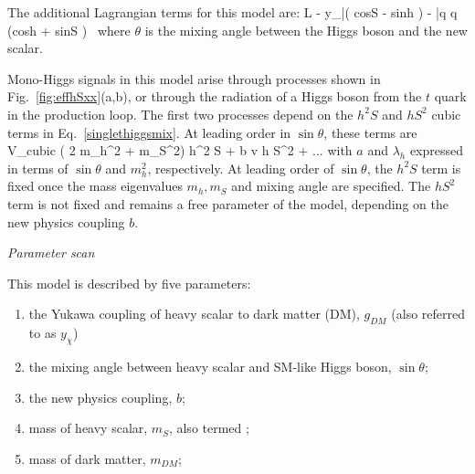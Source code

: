 The additional Lagrangian terms for this model are: 
\be \label{LintScalar2}
L \supset - y_\chi \bar\chi \chi (  cos\theta S - sin\theta h ) -  \bar q q (cos\theta h + sin\theta S )  \,
\ee
where $\theta$ is the mixing angle between the Higgs boson and the new scalar. 

Mono-Higgs signals in this model arise through processes shown in Fig.~\ref{fig:effhSxx}(a,b), or through 
the radiation of a Higgs boson from the  $t$ quark in the production loop. The first two processes
depend on the $h^2 S$ and $h S^2$ cubic terms in Eq.~\eqref{singlethiggsmix}.  
At leading order in $\sin\theta$, these terms are
\be
V_{\rm cubic} \approx {} ( 2 m_h^2 + m_S^2) h^2 S  + b v h S^2 + ...
\ee
with $a$ and $\lambda_h$ expressed in terms of $\sin\theta$ and $m_h^2$, respectively.  
At leading order of $\sin\theta$, the $h^2 S$ term is fixed once the mass eigenvalues $m_h, m_S$ 
and mixing angle are specified.  The $h S^2$ term is not fixed and remains a free parameter of the model, depending on 
the new physics coupling $b$. 

\textit{Parameter scan}

This model is described by five parameters: 

\begin{enumerate}
	\item the Yukawa coupling of heavy scalar to dark matter (DM), $g_{DM}$ (also referred to as $y_\chi$) 
	\item the mixing angle between heavy scalar and SM-like Higgs boson, $\sin\theta$;
	\item the new physics coupling, $b$;
	\item mass of heavy scalar, $m_{S}$, also termed \mmed;
	\item mass of dark matter, $m_{DM}$;
\end{enumerate}

